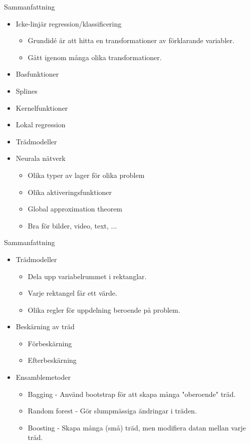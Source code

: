 \documentclass[10pt,english]{beamer}
\begin{document}
\begin{frame}{Sammanfattning}
    
    \begin{itemize}
        \item Icke-linjär regression/klassificering
        \begin{itemize}
            \item Grundidé är att hitta en transformationer av förklarande variabler.
            \item Gått igenom många olika transformationer.
        \end{itemize}
        \item Basfunktioner
        \item Splines
        \item Kernelfunktioner
        \item Lokal regression
        \item Trädmodeller
        \item Neurala nätverk
        \begin{itemize}
            \item Olika typer av lager för olika problem
            \item Olika aktiveringsfunktioner
            \item Global approximation theorem
            \item Bra för bilder, video, text, ...
        \end{itemize}
    \end{itemize}

\end{frame}

\begin{frame}{Sammanfattning}
    \begin{itemize}
        \item Trädmodeller
        \begin{itemize}
            \item Dela upp variabelrummet i rektanglar.
            \item Varje rektangel får ett värde.
            \item Olika regler för uppdelning beroende på problem.
        \end{itemize}
        \item Beskärning av träd
        \begin{itemize}
            \item Förbeskärning
            \item Efterbeskärning
        \end{itemize}
        \item Ensamblemetoder
        \begin{itemize}
            \item Bagging - Använd bootstrap för att skapa många "oberoende" träd.
            \item Random forest - Gör slumpmässiga ändringar i träden.
            \item Boosting - Skapa många (små) träd, men modifiera datan mellan varje träd.
        \end{itemize}
    \end{itemize}
\end{frame}
\end{document}
